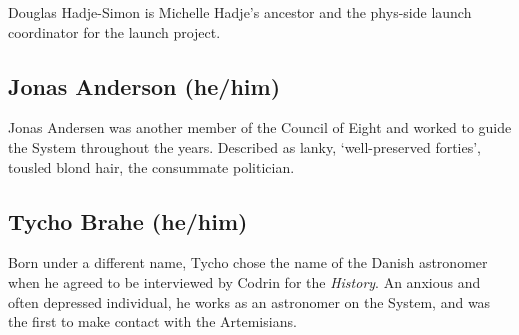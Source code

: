 Douglas Hadje-Simon is Michelle Hadje's ancestor and the phys-side launch coordinator for the launch project.

\begin{comment}
\emph{Appears in:}

\begin{itemize}
\tightlist
\item
  \href{https://toledot.post-self.ink}{\emph{Toledot}}
\item
  \href{https://neviim.post-self.ink}{\emph{Nevi'im}}
\item
  \href{https://mitzvot.post-self.ink}{\emph{Mitzvot}}
\item
  ``Selected Letters'' (mentioned)
\end{itemize}
\end{comment}

\subsection{Jonas Anderson (he/him)}

Jonas Andersen was another member of the Council of Eight and worked to guide the System throughout the years. Described as lanky, `well-preserved forties', tousled blond hair, the consummate politician.

\begin{comment}
\emph{Appears in:}

\begin{itemize}
\tightlist
\item
  \href{https://qoheleth.post-self.ink}{\emph{Qoheleth}} (mentioned)
\item
  \href{https://toledot.post-self.ink}{\emph{Toledot}}
\item
  \href{https://neviim.post-self.ink}{\emph{Nevi'im}}
\item
  \href{https://mitzvot.post-self.ink}{\emph{Mitzvot}}
\item
  ``Selected Letters'' (mentioned)
\end{itemize}
\end{comment}

\subsection{Tycho Brahe (he/him)}

Born under a different name, Tycho chose the name of the Danish astronomer when he agreed to be interviewed by Codrin for the \emph{History}. An anxious and often depressed individual, he works as an astronomer on the System, and was the first to make contact with the Artemisians.


